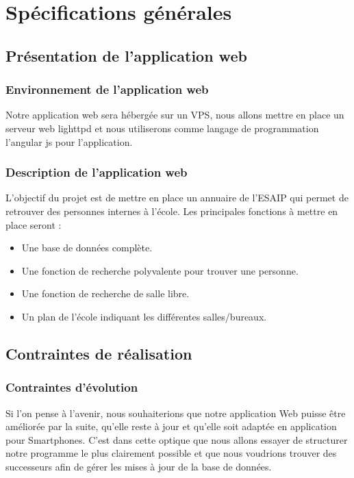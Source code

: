 \documentclass[11pt,a4paper]{report}
\begin{document}
	\chapter{Spécifications générales}
		\section{Présentation de l'application web}
            \subsection{Environnement de l'application web}
            	Notre application web sera hébergée sur un VPS, nous allons mettre en place un serveur web lighttpd et nous utiliserons comme langage de programmation l’angular js pour l’application.
            \subsection{Description de l'application web}
            	L’objectif du projet est de mettre en place un annuaire de l’ESAIP qui permet de retrouver des personnes internes à l’école. Les principales fonctions à mettre en place seront :   
            	\begin{itemize}
            		\item Une base de données complète.
            		\item Une fonction de recherche polyvalente pour trouver une personne.
            		\item Une fonction de recherche de salle libre.
            		\item Un plan de l’école indiquant les différentes salles/bureaux.
				\end{itemize}
				            				
		\section{Contraintes de réalisation}
			\subsection{Contraintes d'évolution}
				Si l’on pense à l’avenir, nous souhaiterions que notre application Web puisse être améliorée par la suite, qu’elle reste à jour et qu’elle soit adaptée en application pour Smartphones. C’est dans cette optique que nous allons essayer de structurer notre programme le plus clairement possible et que nous voudrions trouver des successeurs afin de gérer les mises à jour de la base de données.		
\end{document}
